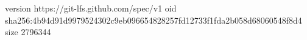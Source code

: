 version https://git-lfs.github.com/spec/v1
oid sha256:4b94d91d9979524302c9eb096654828257fd12733f1fda2b058d68060548f8d4
size 2796344
